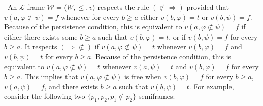 \documentclass{LMCS}
\theoremstyle{remark}
\newcommand{\lp}{\mathcal{L}}
\newcommand{\W}{\mathcal{W}}
\newcommand{\Ra}{\Rightarrow}
\newcommand{\bs}{\bigskip}
\newcommand{\tup}[1]{\langle #1 \rangle}
\newcommand{\fe}{\varphi}
\begin{document}
\begin{exas}
\item{}\
An $\lp$-frame ${\W=\tup{W, \leq,v}}$
respects the rule $(\not\subset\Ra)$ provided that
$v(a,\fe\not\subset\psi)=f$ whenever for every $b \geq a$
either $v(b,\fe)=t$ or $v(b,\psi)=f$. 
Because of the persistence condition, this is equivalent to
$v(a,\fe\not\subset\psi)=f$ if either there exists some 
$b \geq a$ such that $v(b,\fe)=t$, or if $v(b,\psi)=f$ for every $b \geq a$.
It respects $(\Ra \not\subset)$ if
$v(a,\fe\not\subset\psi)=t$ whenever
$v(b,\fe)=f$ and $v(b,\psi)=t$ for every $b \geq a$. 
Because of the persistence condition, this is equivalent to
$v(a,\fe\not\subset\psi)=t$ whenever $v(a,\psi)=t$ and
$v(b,\fe)=f$ for every $b \geq a$.
This implies that $v(a,\fe\not\subset\psi)$ is free
when $v(b,\fe)=f$ for every $b \geq a$, 
$v(a,\psi)=f$, and 
there exists $b \geq a$ such that $v(b,\psi)=t$.
For example, consider the following two 
$\{p_1,p_2,p_1\not\subset p_2\}$-semiframes:


\bs

\begin{center}


\end{center}
\end{exas}
\end{document}
